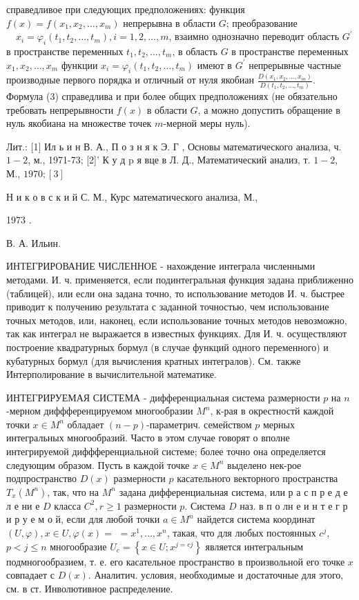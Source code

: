 \documentclass[10pt]{article}
\begin{document}
справедливое при следующих предположениях: функция $f(x)=f\left(x_{1}, x_{2}, \ldots, x_{m}\right)$ непрерывна в области $G$; преобразование $\quad x_{i}=\varphi_{i}\left(t_{1}, t_{2}, \ldots, t_{m}\right), i=1,2, \ldots, m$, взаимно однозначно переводит область $G^{\prime}$ в пространстве переменных $t_{1}, t_{2}, \ldots, t_{m}$, в область $G$ в пространстве переменных $x_{1}, x_{2}, \ldots, x_{m}$ функции $x_{i}=\varphi_{i}\left(t_{1}, t_{2}, \ldots, t_{m}\right)$ имеют в $G^{\prime}$ непрерывные частные производные первого порядка и отличный от нуля якобиан $\frac{D\left(x_{1}, x_{2}, \ldots, x_{m}\right)}{D\left(t_{1}, t_{2}, \ldots, t_{m}\right)}$. Формула (3) справедлива и при более общих предположениях (не обязательно требовать непрерывности $f(x)$ в области $G$, а можно допустить обращение в нуль якобиана на множестве точек $m$-мерной меры нуль).



Лит.: [1] Ил ь и н В. А., П о з н я к Э. Г , Основы математического анализа, ч. $1-2$, м., 1971-73; [2]' К у д p я вце в Л. Д., Математический анализ, т. $1-2$, М., $1970 ;[3]$

Н и к о в с к и й С. М., Курс математического анализа, М.,

1973 .

В. А. Ильин.



ИНТЕГРИРОВАНИЕ ЧИСЛЕННОЕ - нахождение интеграла численными методами. И. ч. применяется, если подинтегральная функция задана приближенно (таблицей), или если она задана точно, то использование методов И. ч. быстрее приводит к получению результата с заданной точностью, чем использование точных методов, или, наконец, если использование точных методов невозможно, так как интеграл не выражается в известных функциях. Для И. ч. осуществляют построение квадратурных бормул (в случае функций одного переменного) и кубатурных бормул (для вычисления кратных интегралов). См. также Интерполирование в вычислительной математике.



ИНТЕГРИРУЕМАЯ СИСТЕМА - дифференциальная система размерности $p$ на $n$-мерном диффференцируемом многообразии $M^{n}$, к-рая в окрестностй каждой точки $x \in M^{n}$ обладает $(n-p)$-параметрич. семейством $p$ мерных интегральных многообразий. Часто в этом случае говорят о вполне интегрируемой диффференциальной системе; более точно она определяется следующим образом. Пусть в каждой точке $x \in M^{n}$ выделено нек-рое подпространство $D(x)$ размерности $p$ касательного векторного пространства $T_{x}\left(M^{n}\right)$, так, что на $M^{n}$ задана дифференциальная система, или р а с п р е д е л е ни е $D$ класса $C^{2}, r \geqslant 1$ размерности $p$. Система $D$ наз. в п о лн е и н т е г р и р у е м о й, если для любой точки $a \in M^{n}$ найдется система координат $(U, \varphi), x \in U, \varphi(x)=$ $=x^{1}, \ldots, x^{n}$, такая, что для любых постоянных $c^{j}$, $p<j \leqslant n$ многообразие $U_{c}=\left\{x \in U ; x^{j=c j}\right\}$ является интегральным подмногообразием, т. е. его касательное пространство в произвольной его точке $x$ совпадает с $D(x)$. Аналитич. условия, необходимые и достаточные для этого, см. в ст. Инволютивное распределение.
\end{document}
